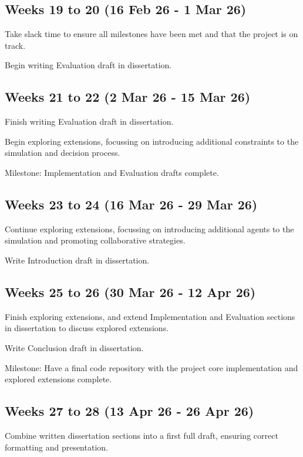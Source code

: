 \documentclass[12pt,a4paper,twoside]{article}
\begin{document}
\subsection*{Weeks 19 to 20 (16 Feb 26 - 1 Mar 26)}

Take slack time to ensure all milestones have been met and that the project is on track.

Begin writing Evaluation draft in dissertation.

\subsection*{Weeks 21 to 22 (2 Mar 26 - 15 Mar 26)}

Finish writing Evaluation draft in dissertation.

Begin exploring extensions, focussing on introducing additional constraints to the simulation and decision process.

Milestone: Implementation and Evaluation drafts complete.

\subsection*{Weeks 23 to 24 (16 Mar 26 - 29 Mar 26)}

Continue exploring extensions, focussing on introducing additional agents to the simulation and promoting collaborative strategies.

Write Introduction draft in dissertation.

\subsection*{Weeks 25 to 26 (30 Mar 26 - 12 Apr 26)}

Finish exploring extensions, and extend Implementation and Evaluation sections in dissertation to discuss explored extensions.

Write Conclusion draft in dissertation.

Milestone: Have a final code repository with the project core implementation and explored extensions complete.

\subsection*{Weeks 27 to 28 (13 Apr 26 - 26 Apr 26)}

Combine written dissertation sections into a first full draft, ensuring correct formatting and presentation.
\end{document}
